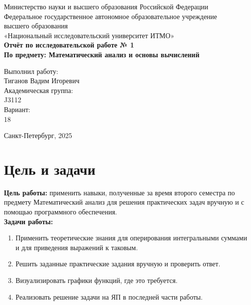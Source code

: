 \documentclass[a4paper,12pt]{article}
\begin{document}
\thispagestyle{empty}
\begin{center}
    \large
    Министерство науки и высшего образования Российской Федерации\\
    Федеральное государственное автономное образовательное учреждение\\
    высшего образования\\
    «Национальный исследовательский университет ИТМО»\\
    \vspace{5cm}
    \textbf{Отчёт по исследовательской работе № 1}\\
    \textbf{По предмету: Математический анализ и основы вычислений}\\
    \vspace{6cm}
    \begin{flushright}
        Выполнил работу:\\ Тиганов Вадим Игоревич\\
        \vspace{1cm}
        Академическая группа: \\ J3112\\
        \vspace{1cm}
        Вариант: \\18
    \end{flushright}
    \vspace{1cm}
    \vspace{3cm}
    \begin{center}
        Санкт-Петербург, 2025\\
    \end{center}
\end{center}

\newpage

\tableofcontents

\newpage

\section{Цель и задачи}
\textbf{Цель работы:} применить навыки, полученные за время второго семестра по предмету Математический анализ для решения практических задач вручную и с помощью программного обеспечения.\\
\textbf{Задачи работы:}
\begin{enumerate}
    \item Применить теоретические знания для оперирования интегральными суммами и для приведения выражений к таковым.
    \item Решить заданные практические задания вручную и проверить ответ.
    \item Визуализировать графики функций, где это требуется.
    \item Реализовать решение задачи на ЯП в последней части работы.
\end{enumerate}
\end{document}
